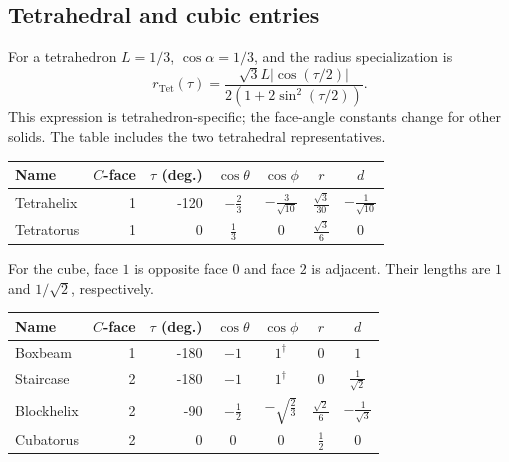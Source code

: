 \documentclass[11pt]{article}
\theoremstyle{definition}
\begin{document}
\subsection{Tetrahedral and cubic entries}
For a tetrahedron $L=1/3$, $\cos\alpha=1/3$, and the radius specialization is
\begin{equation}\label{eq:tetra}
 r_{\mathrm{Tet}}(\tau)=
 \frac{\sqrt3 L|\cos(\tau/2)|}{2(1+2\sin^2(\tau/2))}.
\end{equation}
This expression is tetrahedron-specific; the face-angle constants change
for other solids. The table includes the two tetrahedral representatives.
\begin{center}
\small
\renewcommand{\arraystretch}{1.7}
\begin{tabular}{@{}lrrcccc@{}}
\toprule
Name & $C$-face & $\tau$ (deg.) & $\cos\theta$ & $\cos\phi$ & $r$ & $d$\\
\midrule
Tetrahelix & 1 & -120 & $\displaystyle - \frac{2}{3}$ & $\displaystyle - \frac{3}{\sqrt{10}}$ & $\displaystyle \frac{\sqrt{3}}{30}$ & $\displaystyle - \frac{1}{\sqrt{10}}$\\
Tetratorus & 1 & 0 & $\displaystyle \frac{1}{3}$ & $\displaystyle 0$ & $\displaystyle \frac{\sqrt{3}}{6}$ & $\displaystyle 0$\\
\bottomrule
\end{tabular}
\end{center}
For the cube, face $1$ is opposite face $0$ and face $2$ is adjacent.
Their lengths are $1$ and $1/\sqrt2$, respectively.
\begin{center}
\small
\renewcommand{\arraystretch}{1.7}
\begin{tabular}{@{}lrrcccc@{}}
\toprule
Name & $C$-face & $\tau$ (deg.) & $\cos\theta$ & $\cos\phi$ & $r$ & $d$\\
\midrule
Boxbeam & 1 & -180 & $\displaystyle -1$ & $\displaystyle 1^{\dagger}$ & $\displaystyle 0$ & $\displaystyle 1$\\
Staircase & 2 & -180 & $\displaystyle -1$ & $\displaystyle 1^{\dagger}$ & $\displaystyle 0$ & $\displaystyle \frac{1}{\sqrt{2}}$\\
Blockhelix & 2 & -90 & $\displaystyle - \frac{1}{2}$ & $\displaystyle - \sqrt{\frac{2}{3}}$ & $\displaystyle \frac{\sqrt{2}}{6}$ & $\displaystyle - \frac{1}{\sqrt{3}}$\\
Cubatorus & 2 & 0 & $\displaystyle 0$ & $\displaystyle 0$ & $\displaystyle \frac{1}{2}$ & $\displaystyle 0$\\
\bottomrule
\end{tabular}
\end{center}
\end{document}
